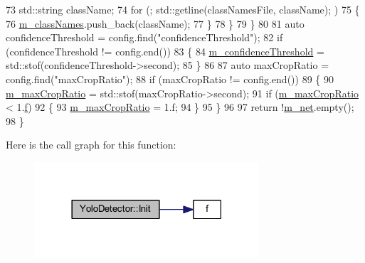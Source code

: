 \begin{DoxyCode}
73             std::string className;
74             \textcolor{keywordflow}{for} (; std::getline(classNamesFile, className); )
75             \{
76                 \mbox{\hyperlink{class_yolo_detector_aa0a06104a5778e9009ebfb0bbc6cecab}{m\_classNames}}.push\_back(className);
77             \}
78         \}
79     \}
80 
81     \textcolor{keyword}{auto} confidenceThreshold = config.find(\textcolor{stringliteral}{"confidenceThreshold"});
82     \textcolor{keywordflow}{if} (confidenceThreshold != config.end())
83     \{
84         \mbox{\hyperlink{class_yolo_detector_a78b57c44b28d1f817940177d197612ed}{m\_confidenceThreshold}} = std::stof(confidenceThreshold->second);
85     \}
86 
87     \textcolor{keyword}{auto} maxCropRatio = config.find(\textcolor{stringliteral}{"maxCropRatio"});
88     \textcolor{keywordflow}{if} (maxCropRatio != config.end())
89     \{
90         \mbox{\hyperlink{class_yolo_detector_a86e05dcc3f10e2b0a1522f7513ff89e5}{m\_maxCropRatio}} = std::stof(maxCropRatio->second);
91         \textcolor{keywordflow}{if} (\mbox{\hyperlink{class_yolo_detector_a86e05dcc3f10e2b0a1522f7513ff89e5}{m\_maxCropRatio}} < 1.\mbox{\hyperlink{rings_8cpp_a77369fc4d5326a16d2c603e032023528}{f}})
92         \{
93             \mbox{\hyperlink{class_yolo_detector_a86e05dcc3f10e2b0a1522f7513ff89e5}{m\_maxCropRatio}} = 1.f;
94         \}
95     \}
96 
97     \textcolor{keywordflow}{return} !\mbox{\hyperlink{class_yolo_detector_ac5a1c603d2c9eaabf78549ca0125c1c7}{m\_net}}.empty();
98 \}
\end{DoxyCode}
Here is the call graph for this function\+:\nopagebreak
\begin{figure}[H]
\begin{center}
\leavevmode
\includegraphics[width=237pt]{class_yolo_detector_ac518bc6743145447f19c937c345689c0_cgraph}
\end{center}
\end{figure}
\mbox{\label{class_base_detector_ab459f4e77cf1110cc1ee84027f0f2a03}} 
